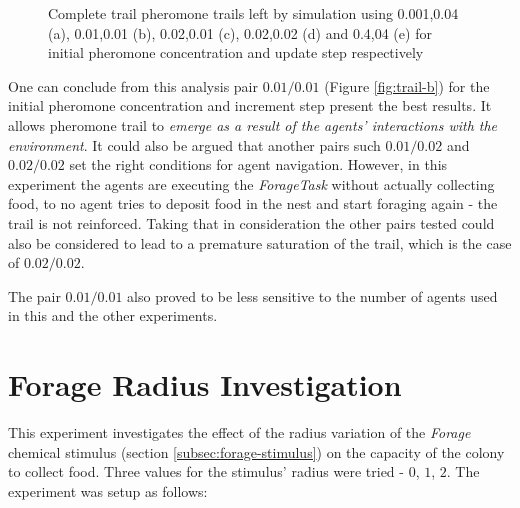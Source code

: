 \begin{figure}[H]
 \quad

\caption[Example of complete pheromone trails]{Complete trail pheromone trails left by simulation using 0.001,0.04 (a), 0.01,0.01 (b), 0.02,0.01 (c), 0.02,0.02 (d) and 0.4,04 (e) for initial pheromone concentration and update step respectively}
\label{fig:trails}
\end{figure}

One can conclude from this analysis pair $0.01/0.01$ (Figure \ref{fig:trail-b}) for the initial pheromone concentration and increment step present the best results. It allows pheromone trail to \emph{emerge as a result of the agents' interactions with the environment}. It could also be argued that another pairs such $0.01/0.02$ and $0.02/0.02$ set the right conditions for agent navigation. However, in this experiment the agents are executing the \emph{ForageTask} without actually collecting food, to no agent tries to deposit food in the nest and start foraging again - the trail is not reinforced. Taking that in consideration the other pairs tested could also be considered to lead to a premature saturation of the trail, which is the case of $0.02/0.02$.

The pair $0.01/0.01$ also proved to be less sensitive to the number of agents used in this and the other experiments.

\section{Forage Radius Investigation}
\label{sec:forage-radius-inv}

This experiment investigates the effect of the radius variation of the \emph{Forage} chemical stimulus (section \ref{subsec:forage-stimulus}) on the capacity of the colony to collect food. Three values for the stimulus' radius were tried - $0$, $1$, $2$. The experiment was setup as follows:

